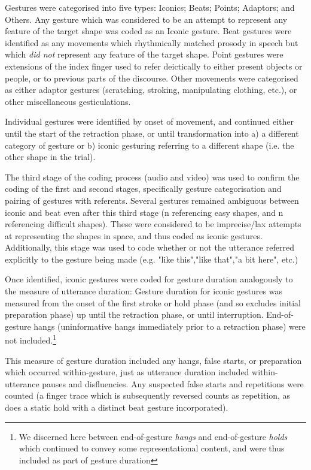 \documentclass[a4paper,man,natbib]{apa6}
\newcommand*{\term}[1]{\emph{#1}} %
\begin{document}
Gestures were categorised into five types: Iconics; Beats; Points; Adaptors; and Others. 
Any gesture which was considered to be an attempt to represent any feature of the target shape was coded as an Iconic gesture.
Beat gestures were identified as any movements which rhythmically matched prosody in speech but which \emph{did not} represent any feature of the target shape.
Point gestures were extensions of the index finger used to refer deictically to either present objects or people, or to previous parts of the discourse.
Other movements were categorised as either adaptor gestures (scratching, stroking, manipulating clothing, etc.), or other miscellaneous gesticulations.

Individual gestures were identified by onset of movement, and continued either until the start of the retraction phase, or until transformation into a) a different category of gesture or b) iconic gesturing referring to a different shape (i.e. the other shape in the trial).

The third stage of the coding process (audio and video) was used to confirm the coding of the first and second stages, specifically gesture categorisation and pairing of gestures with referents.
Several gestures remained ambiguous between iconic and beat even after this third stage (n referencing easy shapes, and n referencing difficult shapes).%
These were considered to be imprecise/lax attempts at representing the shapes in space, and thus coded as iconic gestures.
Additionally, this stage was used to code whether or not the utterance referred explicitly to the gesture being made (e.g. "like this","like that","a bit here", etc.)

Once identified, iconic gestures were coded for gesture duration analogously to the measure of utterance duration:
Gesture duration for iconic gestures was measured from the onset of the first stroke or hold phase (and so excludes initial preparation phase) up until the retraction phase, or until interruption.
End-of-gesture hangs (uninformative hangs immediately prior to a retraction phase) were not included.\footnote{We discerned here between end-of-gesture \term{hangs} and end-of-gesture \term{holds} which continued to convey some representational content, and were thus included as part of gesture duration}

This measure of gesture duration included any hangs, false starts, or preparation which occurred within-gesture, just as utterance duration included within-utterance pauses and disfluencies.
Any suspected false starts and repetitions were counted (a finger trace which is subsequently reversed counts as repetition, as does a static hold with a distinct beat gesture incorporated).
\end{document}
